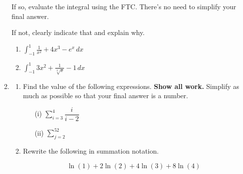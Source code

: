 \documentclass[11pt]{article}
\begin{document}
\begin{enumerate}
If so, evaluate the integral using the FTC. There's no need to simplify your final answer.

If not, clearly indicate that and explain why.

\begin{enumerate}
    \item $\displaystyle\int_{-1}^{1}\frac{1}{x^{2}}+4x^3-e^x\, dx$

    \vfill

    \item $\displaystyle\int_{-1}^1 3x^2+\frac{1}{\sqrt[3]{x}}-1\, dx$

    \vfill
\end{enumerate}


\newpage


\item \begin{enumerate}
    \item Find the value of the following expressions. \textbf{Show all work.} Simplify as much as possible so that your final answer is a number.

    \begin{enumerate}
        \item[(i)] $\displaystyle\sum_{i=3}^4\dfrac{i}{i-2}$

        \vfill

        \item[(ii)] $\displaystyle\sum_{j=2}^52$ 

        \vfill
    \end{enumerate}

    \item Rewrite the following in summation notation. 

    \[\ln(1)+2\ln(2)+4\ln(3)+8\ln(4)\]

    \vfill
\end{enumerate}


\newpage


\end{enumerate}
\end{document}
